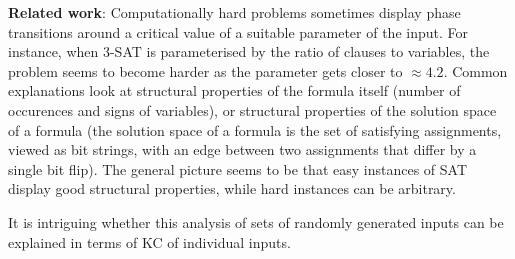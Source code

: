\documentclass{article}
\theoremstyle{plain} \numberwithin{equation}{section}
\theoremstyle{definition}
\begin{document}





\medskip

\noindent
{\bf Related work}:
Computationally hard problems sometimes display phase transitions around a critical value of a suitable parameter of the input. For instance, when 3-SAT is parameterised by the ratio of clauses to variables, the problem seems to become harder as the parameter gets closer to $\approx 4.2$. Common explanations look at structural properties of the formula itself \cite{DBM00} (number of occurences and signs of variables), or structural properties of the solution space of a formula \cite{AcRT06,GKMP06} (the solution space of a formula is the set of satisfying assignments, viewed as bit strings, with an edge between two assignments that differ by a single bit flip). The general picture seems to be that easy instances of SAT display good structural properties, while hard instances can be arbitrary.

It is intriguing whether this analysis of sets of randomly generated inputs can be explained in terms of KC of individual inputs.


\end{document}
